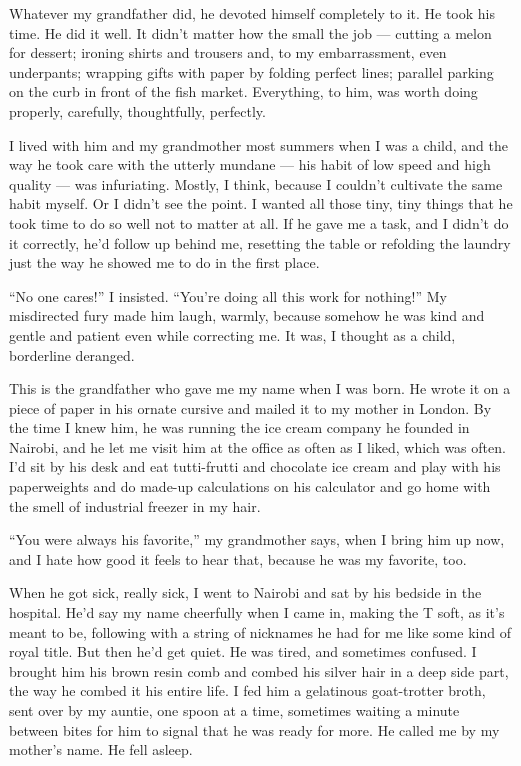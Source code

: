 Whatever my grandfather did, he devoted himself completely to it. He
took his time. He did it well. It didn't matter how the small the job
--- cutting a melon for dessert; ironing shirts and trousers and, to my
embarrassment, even underpants; wrapping gifts with paper by folding
perfect lines; parallel parking on the curb in front of the fish market.
Everything, to him, was worth doing properly, carefully, thoughtfully,
perfectly.

I lived with him and my grandmother most summers when I was a child, and
the way he took care with the utterly mundane --- his habit of low speed
and high quality --- was infuriating. Mostly, I think, because I
couldn't cultivate the same habit myself. Or I didn't see the point. I
wanted all those tiny, tiny things that he took time to do so well not
to matter at all. If he gave me a task, and I didn't do it correctly,
he'd follow up behind me, resetting the table or refolding the laundry
just the way he showed me to do in the first place.

``No one cares!'' I insisted. ``You're doing all this work for
nothing!'' My misdirected fury made him laugh, warmly, because somehow
he was kind and gentle and patient even while correcting me. It was, I
thought as a child, borderline deranged.

This is the grandfather who gave me my name when I was born. He wrote it
on a piece of paper in his ornate cursive and mailed it to my mother in
London. By the time I knew him, he was running the ice cream company he
founded in Nairobi, and he let me visit him at the office as often as I
liked, which was often. I'd sit by his desk and eat tutti-frutti and
chocolate ice cream and play with his paperweights and do made-up
calculations on his calculator and go home with the smell of industrial
freezer in my hair.

``You were always his favorite,'' my grandmother says, when I bring him
up now, and I hate how good it feels to hear that, because he was my
favorite, too.

When he got sick, really sick, I went to Nairobi and sat by his bedside
in the hospital. He'd say my name cheerfully when I came in, making the
T soft, as it's meant to be, following with a string of nicknames he had
for me like some kind of royal title. But then he'd get quiet. He was
tired, and sometimes confused. I brought him his brown resin comb and
combed his silver hair in a deep side part, the way he combed it his
entire life. I fed him a gelatinous goat-trotter broth, sent over by my
auntie, one spoon at a time, sometimes waiting a minute between bites
for him to signal that he was ready for more. He called me by my
mother's name. He fell asleep.


